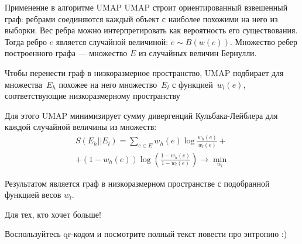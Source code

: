 \documentclass[final]{beamer}
\newlength{\onecolwid}
\begin{document}
\begin{frame}[t]
\begin{columns}[t]
\begin{column}{\onecolwid}
\begin{block}{Применение в алгоритме UMAP}
UMAP строит ориентированный взвешенный граф: ребрами соединяются каждый объект с наиболее похожими на него из выборки. Вес ребра можно интерпретировать как вероятность его существования. Тогда ребро $e$ является случайной величиной: $e \sim B(w(e))$. Множество ребер построенного графа --- множество $E$ из случайных величин Бернулли.

Чтобы перенести граф в низкоразмерное пространство, UMAP подбирает для множества~$E_h$ похожее на него множество~$E_l$ с функцией~$w_l(e)$, соответствующие низкоразмерному пространству

Для этого UMAP минимизирует сумму дивергенций Кульбака-Лейблера для каждой случайной величины из множеств:
\begin{multline*}
	S(E_h||E_l) = \sum_{e \in E} w_h(e) \log \frac{w_h(e)}{w_l(e)} + \\ + (1 - w_h(e)) \log \left(\frac{1 - w_h(e)}{1 - w_l(e)}\right) \rightarrow \min_{w_l}
\end{multline*}

Результатом является граф в низкоразмерном пространстве с подобранной функцией весов $w_l$.
\end{block}






\begin{block}{Для тех, кто хочет больше!}

Воспользуйтесь qr-кодом и посмотрите полный текст повести про энтропию :)


\end{block}
\end{column}
\end{columns}
\end{frame}
\end{document}
